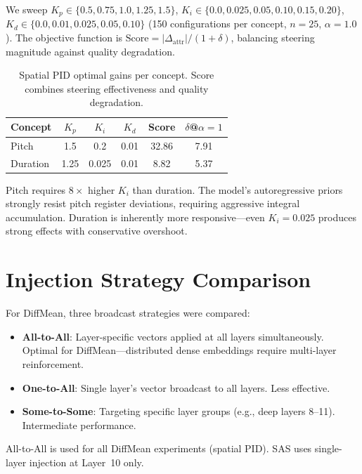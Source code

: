 \documentclass{article}
\theoremstyle{plain}
\begin{document}
We sweep $K_p \in \{0.5, 0.75, 1.0, 1.25, 1.5\}$, $K_i \in \{0.0, 0.025, 0.05, 0.10, 0.15, 0.20\}$, $K_d \in \{0.0, 0.01, 0.025, 0.05, 0.10\}$ (150 configurations per concept, $n{=}25$, $\alpha{=}1.0$). The objective function is $\text{Score} = |\Delta_\text{attr}| / (1 + \delta)$, balancing steering magnitude against quality degradation.

\begin{table}[h]
  \caption{Spatial PID optimal gains per concept. Score combines steering effectiveness and quality degradation.}
  \label{tab:grid_search}
  \begin{center}
  \begin{small}
  \begin{tabular}{lccccc}
    \toprule
    Concept & $K_p$ & $K_i$ & $K_d$ & Score & $\delta$@$\alpha{=}1$ \\
    \midrule
    Pitch & 1.5 & 0.2 & 0.01 & 32.86 & 7.91 \\
    Duration & 1.25 & 0.025 & 0.01 & 8.82 & 5.37 \\
    \bottomrule
  \end{tabular}
  \end{small}
  \end{center}
\end{table}

Pitch requires $8{\times}$ higher $K_i$ than duration. The model's autoregressive priors strongly resist pitch register deviations, requiring aggressive integral accumulation. Duration is inherently more responsive---even $K_i{=}0.025$ produces strong effects with conservative overshoot.

\section{Injection Strategy Comparison}
\label{app:injection}

For DiffMean, three broadcast strategies were compared:
\begin{itemize}
    \item \textbf{All-to-All}: Layer-specific vectors applied at all layers simultaneously. Optimal for DiffMean---distributed dense embeddings require multi-layer reinforcement.
    \item \textbf{One-to-All}: Single layer's vector broadcast to all layers. Less effective.
    \item \textbf{Some-to-Some}: Targeting specific layer groups (e.g., deep layers 8--11). Intermediate performance.
\end{itemize}
All-to-All is used for all DiffMean experiments (spatial PID). SAS uses single-layer injection at Layer~10 only.
\end{document}
